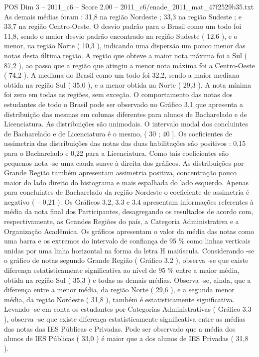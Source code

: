 \begin{textsample}{POS Dim 3 – 2011\_c6 – Score 2.00 – 2011\_c6/enade\_2011\_mat\_47f2529b35.txt}
As demais médias foram : 31,8 na região Nordeste ; 33,3 na região Sudeste ; e 33,7 na região Centro-Oeste.
O desvio padrão para o Brasil como um todo foi 11,8, sendo o maior desvio padrão encontrado na região Sudeste ( 12,6 ), e o menor, na região Norte ( 10,3 ), indicando uma dispersão um pouco menor das notas desta última região.
A região que obteve a maior nota máxima foi a Sul ( 87,2 ), ao passo que a região que atingiu a menor nota máxima foi a Centro-Oeste ( 74,2 ).
A mediana do Brasil como um todo foi 32,2, sendo a maior mediana obtida na região Sul ( 35,0 ), e a menor obtida na Norte ( 29,3 ).
A nota mínima foi zero em todas as regiões, sem exceção.
O comportamento das notas dos estudantes de todo o Brasil pode ser observado no Gráfico 3.1 que apresenta a distribuição das mesmas em colunas diferentes para alunos de Bacharelado e de Licenciatura.
As distribuições são unimodais.
O intervalo modal dos concluintes de Bacharelado e de Licenciatura é o mesmo, ( 30 ; 40 ].
Os coeficientes de assimetria das distribuições das notas das duas habilitações são positivos : 0,15 para o Bacharelado e 0,22 para a Licenciatura.
Como tais coeficientes são pequenos nota -se uma cauda suave à direita dos gráficos.
As distribuições por Grande Região também apresentam assimetria positiva, concentração pouco maior do lado direito do histograma e mais espalhada do lado esquerdo.
Apenas para concluintes de Bacharelado da região Nordeste o coeficiente de assimetria é negativo ( – 0,21 ).
Os Gráficos 3.2, 3.3 e 3.4 apresentam informações referentes à média da nota final dos Participantes, desagregando os resultados de acordo com, respectivamente, as Grandes Regiões do país, a Categoria Administrativa e a Organização Acadêmica.
Os gráficos apresentam o valor da média das notas como uma barra e os extremos do intervalo de confiança de 95 \% como linhas verticais unidas por uma linha horizontal na forma da letra H maiúscula.
Considerando -se o gráfico de notas segundo Grande Região ( Gráfico 3.2 ), observa -se que existe diferença estatisticamente significativa ao nível de 95 \% entre a maior média, obtida na região Sul ( 35,3 ) e todas as demais médias.
Observa -se, ainda, que a diferença entre a menor média, da região Norte ( 29,6 ), e a segunda menor média, da região Nordeste ( 31,8 ), também é estatisticamente significativa.
Levando -se em conta os estudantes por Categorias Administrativas ( Gráfico 3.3 ), observa -se que existe diferença estatisticamente significativa entre as médias das notas das IES Públicas e Privadas.
Pode ser observado que a média dos alunos de IES Públicas ( 33,0 ) é maior que a dos alunos de IES Privadas ( 31,8 ).

\end{textsample}
